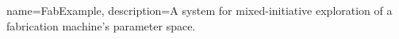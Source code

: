 {%
    name=FabExample,
    description={A system for mixed-initiative exploration of a fabrication machine's parameter space.}
}

\newcommand{\andrew}[1]{{\color{red}\textbf{AH\@: #1}\normalfont}}
\newcommand{\bjoern}[1]{{\color{blue}\textbf{BH\@: #1}\normalfont}}
\newcommand{\shortchange}[1]{{\color{OliveGreen}\textbf{#1}\normalfont}}
\newenvironment{changes}{\shortchange\bgroup}{\egroup}
